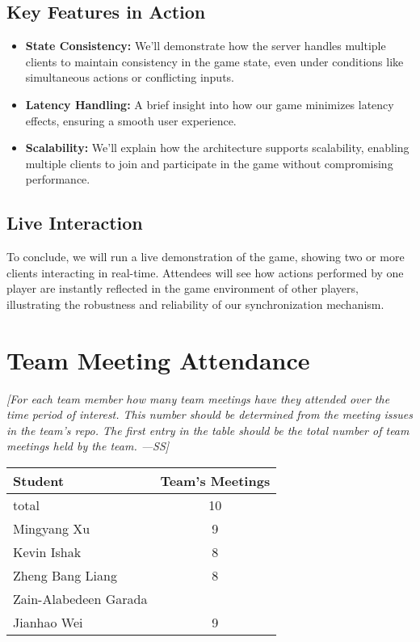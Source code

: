 \documentclass[12pt]{article}
\begin{document}
\subsection{Key Features in Action}
\begin{itemize}
    \item \textbf{State Consistency:} We'll demonstrate how the server handles multiple clients to maintain consistency in the game state, even under conditions like simultaneous actions or conflicting inputs.
    \item \textbf{Latency Handling:} A brief insight into how our game minimizes latency effects, ensuring a smooth user experience.
    \item \textbf{Scalability:} We'll explain how the architecture supports scalability, enabling multiple clients to join and participate in the game without compromising performance.
\end{itemize}

\subsection{Live Interaction}
To conclude, we will run a live demonstration of the game, showing two or more clients interacting in real-time. Attendees will see how actions performed by one player are instantly reflected in the game environment of other players, illustrating the robustness and reliability of our synchronization mechanism.


\section{Team Meeting Attendance}
\textit{[For each team member how many team meetings have they attended over the time period of interest. This number should be determined from the meeting issues in the team’s repo. The first entry in the table should be the total number of team meetings held by the team. ---SS]}

\begin{longtable}{|l|c|}
\hline
\textbf{Student} & \textbf{Team's Meetings} \\
\hline
total & 10 \\
Mingyang Xu & 9 \\
Kevin Ishak & 8 \\
Zheng Bang Liang & 8 \\
Zain-Alabedeen Garada &  \\
Jianhao Wei & 9 \\
\hline
\end{longtable}
\end{document}
